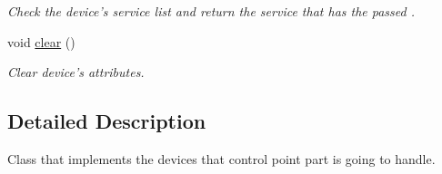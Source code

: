 \begin{DoxyCompactItemize}
\begin{DoxyCompactList}\small\item\em Check the device's service list and return the service that has the passed . \item\end{DoxyCompactList}\item 
void \hyperlink{classBrisaUpnp_1_1BrisaControlPointDevice_a95a5e678c394445f428eda266a2e5864}{clear} ()
\begin{DoxyCompactList}\small\item\em Clear device's attributes. \item\end{DoxyCompactList}\end{DoxyCompactItemize}


\subsection{Detailed Description}
Class that implements the devices that control point part is going to handle. 

